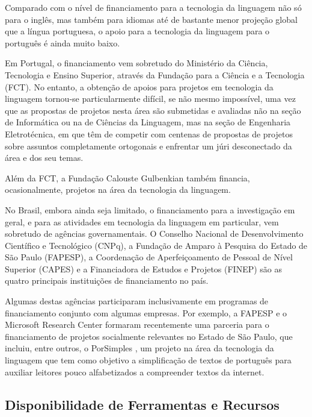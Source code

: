 \begin{multicols}{2}
Comparado com o nível de financiamento para a tecnologia da linguagem
não só para o inglês, mas também para idiomas até de bastante menor projeção global 
que a língua portuguesa, o apoio para a tecnologia da linguagem para o português 
é ainda muito baixo.

Em Portugal, o financiamento vem sobretudo do Ministério da Ciência, 
Tecnologia e Ensino Superior, através da Fundação para a Ciência e a Tecnologia (FCT). 
No entanto, a obtenção de apoios para projetos em tecnologia da linguagem tornou-se particularmente difícil,
se não mesmo impossível, uma vez que as propostas de projetos nesta área são submetidas 
e avaliadas não na seção de Informática ou na de Ciências da Linguagem, mas na seção de Engenharia Eletrotécnica, 
em que têm de competir com centenas de propostas de projetos sobre assuntos completamente ortogonais
e enfrentar um júri desconectado da área e dos seu temas.

Além da FCT, a Fundação Calouste Gulbenkian também financia, ocasionalmente, projetos na área 
da tecnologia da linguagem.

\vskip24mm

No Brasil, embora ainda seja limitado, o financiamento para a investigação em geral, e para as atividades em tecnologia da linguagem em particular, vem sobretudo de agências governamentais. 
O Conselho Nacional de Desenvolvimento Científico e Tecnológico (CNPq), 
a Fundação de Amparo à Pesquisa do Estado de São Paulo (FAPESP), 
a Coordenação de Aperfeiçoamento de Pessoal de Nível Superior (CAPES) 
e a Financiadora de Estudos e Projetos (FINEP) são as quatro principais instituições de financiamento no país. 

Algumas destas agências participaram inclusivamente em programas de financiamento conjunto com algumas empresas. 
Por exemplo, a FAPESP e o Microsoft Research Center formaram recentemente uma parceria para o financiamento de projetos 
socialmente relevantes no Estado de São Paulo, que incluiu, entre outros, o PorSimples \cite{porsimples}, 
um projeto na área da tecnologia da linguagem que tem como objetivo a simplificação de textos de português para auxiliar leitores pouco alfabetizados a compreender textos da internet.


\subsection{Disponibilidade de Ferramentas e Recursos}



\end{multicols}

